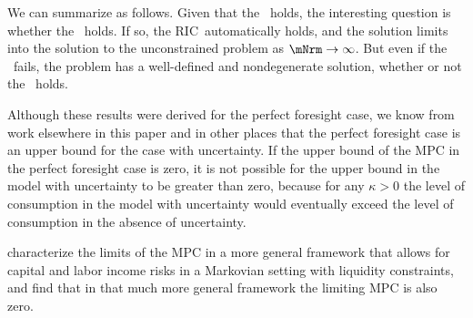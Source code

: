 \documentclass[\econtexRoot/BufferStockTheory]{subfiles}
\newcommand{\subname}{ApndxLiqConstr}
\begin{document}
We can summarize as follows.
Given that the \GICRaw~holds, the interesting question is whether the \FHWC~holds.
If so, the RIC~automatically holds, and the solution limits into the solution to the unconstrained problem as $\mNrm \rightarrow \infty$.
But even if the \FHWC~fails, the problem has a well-defined and nondegenerate solution, whether or not the \RIC~holds.

Although these results were derived for the perfect foresight case, we know from work elsewhere in this paper and in other places that the perfect foresight case is an upper bound for the case with uncertainty.
If the upper bound of the MPC in the perfect foresight case is zero, it is not possible for the upper bound in the model with uncertainty to be greater than zero, because for any $\kappa > 0$ the level of consumption in the model with uncertainty would eventually exceed the level of consumption in the absence of uncertainty.

\cite{maTodaRich} characterize the limits of the MPC in a more general framework that allows for capital and labor income risks in a Markovian setting with liquidity constraints, and find that in that much more general framework the limiting MPC is also zero.%

\compilingasstandalone{\bibstandalone{\subname}}
\end{document}
